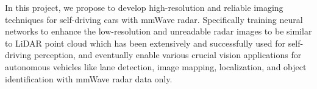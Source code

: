 In this project, we propose to develop high-resolution and reliable imaging techniques for self-driving cars with mmWave radar. Specifically training neural networks to enhance the low-resolution and unreadable radar images to be similar to LiDAR point cloud which has been extensively and successfully used for self-driving perception, and eventually enable various crucial vision applications for autonomous vehicles like lane detection, image mapping, localization, and object identification with mmWave radar data only.
 
